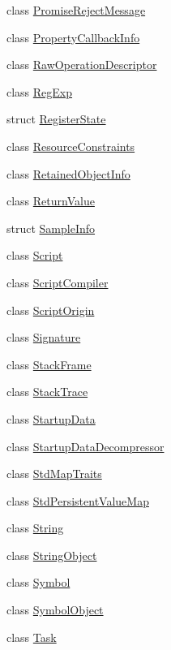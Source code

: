 \begin{DoxyCompactItemize}
\item 
class \hyperlink{classv8_1_1PromiseRejectMessage}{Promise\+Reject\+Message}
\item 
class \hyperlink{classv8_1_1PropertyCallbackInfo}{Property\+Callback\+Info}
\item 
class \hyperlink{classv8_1_1RawOperationDescriptor}{Raw\+Operation\+Descriptor}
\item 
class \hyperlink{classv8_1_1RegExp}{Reg\+Exp}
\item 
struct \hyperlink{structv8_1_1RegisterState}{Register\+State}
\item 
class \hyperlink{classv8_1_1ResourceConstraints}{Resource\+Constraints}
\item 
class \hyperlink{classv8_1_1RetainedObjectInfo}{Retained\+Object\+Info}
\item 
class \hyperlink{classv8_1_1ReturnValue}{Return\+Value}
\item 
struct \hyperlink{structv8_1_1SampleInfo}{Sample\+Info}
\item 
class \hyperlink{classv8_1_1Script}{Script}
\item 
class \hyperlink{classv8_1_1ScriptCompiler}{Script\+Compiler}
\item 
class \hyperlink{classv8_1_1ScriptOrigin}{Script\+Origin}
\item 
class \hyperlink{classv8_1_1Signature}{Signature}
\item 
class \hyperlink{classv8_1_1StackFrame}{Stack\+Frame}
\item 
class \hyperlink{classv8_1_1StackTrace}{Stack\+Trace}
\item 
class \hyperlink{classv8_1_1StartupData}{Startup\+Data}
\item 
class \hyperlink{classv8_1_1StartupDataDecompressor}{Startup\+Data\+Decompressor}
\item 
class \hyperlink{classv8_1_1StdMapTraits}{Std\+Map\+Traits}
\item 
class \hyperlink{classv8_1_1StdPersistentValueMap}{Std\+Persistent\+Value\+Map}
\item 
class \hyperlink{classv8_1_1String}{String}
\item 
class \hyperlink{classv8_1_1StringObject}{String\+Object}
\item 
class \hyperlink{classv8_1_1Symbol}{Symbol}
\item 
class \hyperlink{classv8_1_1SymbolObject}{Symbol\+Object}
\item 
class \hyperlink{classv8_1_1Task}{Task}
\item 

\end{DoxyCompactItemize}
